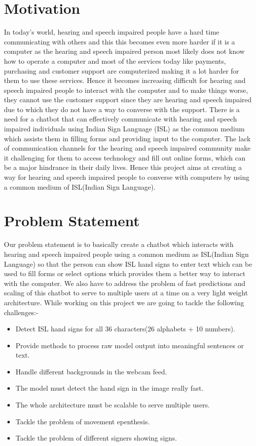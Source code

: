 \documentclass[12pt,a4paper]{report}
\begin{document}
\section{Motivation}
In today's world, hearing and speech impaired people have a hard time communicating with others and this this becomes even more harder if it is a computer as the hearing and speech impaired person most likely does not know how to operate a computer and most of the services today like payments, purchasing and customer support are computerized making it a lot harder for them to use these services. Hence it becomes increasing difficult for hearing and speech impaired people to interact with the computer and to make things worse, they cannot use the customer support since they are hearing and speech impaired due to which they do not have a way to converse with the support. There is a need for a chatbot that can effectively communicate with hearing and speech impaired individuals using Indian Sign Language (ISL) as the common medium which assists them in filling forms and providing input to the computer. The lack of communication channels for the hearing and speech impaired community make it challenging for them to access technology and fill out online forms, which can be a major hindrance in their daily lives. Hence this project aims at creating a way for hearing and speech impaired people to converse with computers by using a common medium of ISL(Indian Sign Language).


\section{Problem Statement}
Our problem statement is to basically create a chatbot which interacts with hearing and speech impaired people using a common medium as ISL(Indian Sign Language) so that the person can show ISL hand signs to enter text which can be used to fill forms or select options which provides them a better way to interact with the computer. We also have to address the problem of fast predictions and scaling of this chatbot to serve to multiple users at a time on a very light weight architecture. While working on this project we are going to tackle the following challenges:-
\begin{itemize}
  \item Detect ISL hand signs for all 36 characters(26 alphabets + 10 numbers).
  \item Provide methods to process raw model output into meaningful sentences or text.
  \item Handle different backgrounds in the webcam feed.
  \item The model must detect the hand sign in the image really fast.
  \item The whole architecture must be scalable to serve multiple users.
  \item Tackle the problem of movement epenthesis.
  \item Tackle the problem of different signers showing signs.
\end{itemize}
\end{document}
